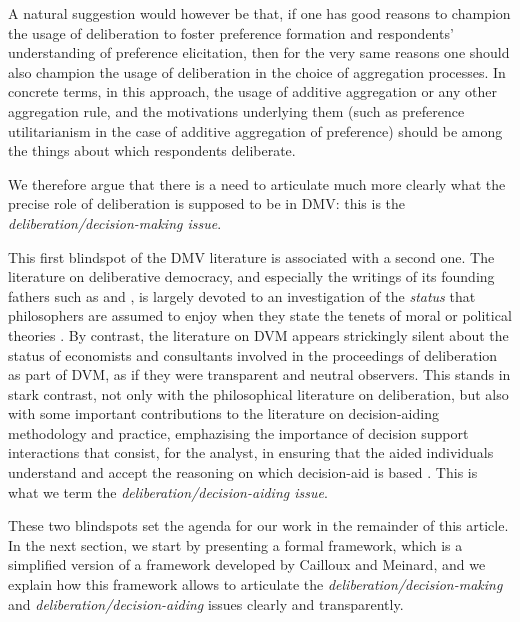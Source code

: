\documentclass[version=3.21, pagesize, twoside=off, bibliography=totoc, DIV=calc, fontsize=12pt, a4paper, french, english]{scrartcl}
\begin{document}
A natural suggestion would however be that, if one has good reasons to champion the usage of deliberation to foster preference formation and respondents' understanding of preference elicitation, then for the very same reasons one should also champion the usage of deliberation in the choice of aggregation processes. In concrete terms, in this approach, the usage of additive aggregation or any other aggregation rule, and the motivations underlying them (such as preference utilitarianism in the case of additive aggregation of preference) should be among the things about which respondents deliberate.

We therefore argue that there is a need to articulate much more clearly what the precise role of deliberation is supposed to be in DMV: this is the \emph{deliberation/decision-making issue}.

This first blindspot of the DMV literature is associated with a second one. The literature on deliberative democracy, and especially the writings of its founding fathers such as \citet{rawls_political_2005} and \citet{habermas_faktizitat_1992}, is largely devoted to an investigation of the \emph{status} that philosophers are assumed to enjoy when they state the tenets of moral or political theories \citep{meinard_du_2014}. By contrast, the literature on DVM appears strickingly silent about the status of economists and consultants involved in the proceedings of deliberation as part of DVM, as if they were transparent and neutral observers. This stands in stark contrast, not only with the philosophical literature on deliberation, but also with some important contributions to the literature on decision-aiding methodology and practice, emphazising the importance of decision support interactions that consist, for the analyst, in ensuring that the aided individuals understand and accept the reasoning on which decision-aid is based \citep{roy_multicriteria_1996}. This is what we term the \emph{deliberation/decision-aiding issue}.

These two blindspots set the agenda for our work in the remainder of this article. In the next section, we start by presenting a formal framework, which is a simplified version of a framework developed by Cailloux and Meinard, and we explain how this framework allows to articulate the \emph{deliberation/decision-making} and \emph{deliberation/decision-aiding} issues clearly and transparently. 
\end{document}
